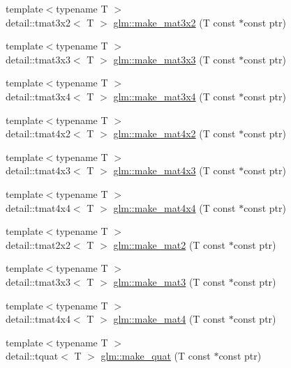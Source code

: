 \begin{DoxyCompactItemize}
\item 
{\footnotesize template$<$typename T $>$ }\\detail\+::tmat3x2$<$ T $>$ \hyperlink{group__gtc__type__ptr_ga8764d696bd4dfb91d689ca196414b36b}{glm\+::make\+\_\+mat3x2} (T const $\ast$const ptr)
\item 
{\footnotesize template$<$typename T $>$ }\\detail\+::tmat3x3$<$ T $>$ \hyperlink{group__gtc__type__ptr_ga56ddd61c1c64dba464e392b2c2011226}{glm\+::make\+\_\+mat3x3} (T const $\ast$const ptr)
\item 
{\footnotesize template$<$typename T $>$ }\\detail\+::tmat3x4$<$ T $>$ \hyperlink{group__gtc__type__ptr_gaae2b48f5109461f13f63ccf5b4cde672}{glm\+::make\+\_\+mat3x4} (T const $\ast$const ptr)
\item 
{\footnotesize template$<$typename T $>$ }\\detail\+::tmat4x2$<$ T $>$ \hyperlink{group__gtc__type__ptr_ga3717ecbb38c8a24043ee17bdff94bca5}{glm\+::make\+\_\+mat4x2} (T const $\ast$const ptr)
\item 
{\footnotesize template$<$typename T $>$ }\\detail\+::tmat4x3$<$ T $>$ \hyperlink{group__gtc__type__ptr_gae91cc925c4154c5fe4ef1fc7da96a9a8}{glm\+::make\+\_\+mat4x3} (T const $\ast$const ptr)
\item 
{\footnotesize template$<$typename T $>$ }\\detail\+::tmat4x4$<$ T $>$ \hyperlink{group__gtc__type__ptr_gaa287485a3978d319e60a1cadd8a1c139}{glm\+::make\+\_\+mat4x4} (T const $\ast$const ptr)
\item 
{\footnotesize template$<$typename T $>$ }\\detail\+::tmat2x2$<$ T $>$ \hyperlink{group__gtc__type__ptr_gafd896ef261762a6ab412b61181d5ecae}{glm\+::make\+\_\+mat2} (T const $\ast$const ptr)
\item 
{\footnotesize template$<$typename T $>$ }\\detail\+::tmat3x3$<$ T $>$ \hyperlink{group__gtc__type__ptr_gacd8f067b4fb7bd3d48663102b5178ef2}{glm\+::make\+\_\+mat3} (T const $\ast$const ptr)
\item 
{\footnotesize template$<$typename T $>$ }\\detail\+::tmat4x4$<$ T $>$ \hyperlink{group__gtc__type__ptr_ga723dd6241d4edf2ad48b25e5007054a7}{glm\+::make\+\_\+mat4} (T const $\ast$const ptr)
\item 
{\footnotesize template$<$typename T $>$ }\\detail\+::tquat$<$ T $>$ \hyperlink{group__gtc__type__ptr_ga341b6592d08bc2e3871ceec05e0c060d}{glm\+::make\+\_\+quat} (T const $\ast$const ptr)

\end{DoxyCompactItemize}
